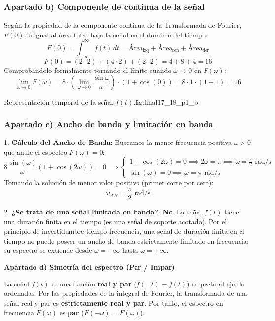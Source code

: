 \begin{resolucion}
\subsubsection*{Apartado b) Componente de continua de la señal}

Según la propiedad de la componente continua de la Transformada de Fourier, $F(0)$ es igual al área total bajo la señal en el dominio del tiempo:
\[
F(0) = \int_{-\infty}^{\infty} f(t) \, dt = \text{Área}_{\text{izq}} + \text{Área}_{\text{cen}} + \text{Área}_{\text{der}}
\]
\[
F(0) = (2 \cdot 2) + (4 \cdot 2) + (2 \cdot 2) = 4 + 8 + 4 = 16
\]
Comprobandolo formalmente tomando el límite cuando $\omega \to 0$ en $F(\omega)$:
\[
\lim_{\omega \to 0} F(\omega) = 8 \cdot \left(\lim_{\omega \to 0} \frac{\sin\omega}{\omega}\right) \cdot (1 + \cos(0)) = 8 \cdot 1 \cdot (1 + 1) = 16
\]

%
         {Representación temporal de la señal $f(t)$.}{fig:final17_18_p1_b}

\newpage
\subsubsection*{Apartado c) Ancho de banda y limitación en banda}

1. \textbf{Cálculo del Ancho de Banda}:
   Buscamos la menor frecuencia positiva $\omega > 0$ que anule el espectro $F(\omega) = 0$:
   \[
   8 \frac{\sin(\omega)}{\omega} (1 + \cos(2\omega)) = 0 \implies \begin{cases} 1 + \cos(2\omega) = 0 \implies 2\omega = \pi \implies \omega = \frac{\pi}{2} \text{ rad/s} \\ \sin(\omega) = 0 \implies \omega = \pi \text{ rad/s} \end{cases}
   \]
   Tomando la solución de menor valor positivo (primer corte por cero):
   \[
   \omega_{AB} = \frac{\pi}{2} \text{ rad/s}
   \]

2. \textbf{¿Se trata de una señal limitada en banda?}:
   \textbf{No}. La señal $f(t)$ tiene una duración finita en el tiempo (es una señal de soporte acotado). Por el principio de incertidumbre tiempo-frecuencia, una señal de duración finita en el tiempo no puede poseer un ancho de banda estrictamente limitado en frecuencia; su espectro se extiende desde $\omega = -\infty$ hasta $\omega = +\infty$.

\textbf{Apartado d) Simetría del espectro (Par / Impar)}

La señal $f(t)$ es una función \textbf{real y par} ($f(-t) = f(t)$) respecto al eje de ordenadas.
Por las propiedades de la integral de Fourier, la transformada de una señal real y par es \textbf{estrictamente real y par}.
Por tanto, el espectro en frecuencia $F(\omega)$ es \textbf{par} ($F(-\omega) = F(\omega)$).
\end{resolucion}

